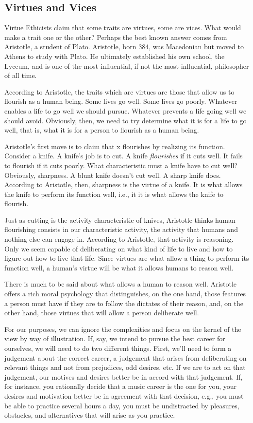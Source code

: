 \documentclass[9pt]{article}
\begin{document}
\subsection{Virtues and Vices}\label{virtues-and-vices}

Virtue Ethicists claim that some traits are virtues, some are vices.
What would make a trait one or the other? Perhaps the best known answer
comes from Aristotle, a student of Plato. Aristotle, born 384, was
Macedonian but moved to Athens to study with Plato. He ultimately
established his own school, the Lyceum, and is one of the most
influential, if not the most influential, philosopher of all time.

According to Aristotle, the traits which are virtues are those that
allow us to flourish as a human being. Some lives go well. Some lives go
poorly. Whatever enables a life to go well we should pursue. Whatever
prevents a life going well we should avoid. Obviously, then, we need to
try determine what it is for a life to go well, that is, what it is for
a person to flourish as a human being.

Aristotle's first move is to claim that x flourishes by realizing its
function. Consider a knife. A knife's job is to cut. A knife
\emph{flourishes} if it cuts well. It fails to flourish if it cuts
poorly. What characteristic must a knife have to cut well? Obviously,
sharpness. A blunt knife doesn't cut well. A sharp knife does. According
to Aristotle, then, sharpness is the virtue of a knife. It is what
allows the knife to perform its function well, i.e., it it is what
allows the knife to flourish.

Just as cutting is the activity characteristic of knives, Aristotle
thinks human flourishing consists in our characteristic activity, the
activity that humans and nothing else can engage in. According to
Aristotle, that activity is reasoning. Only we seem capable of
deliberating on what kind of life to live and how to figure out how to
live that life. Since virtues are what allow a thing to perform its
function well, a human's virtue will be what it allows humans to reason
well.

There is much to be said about what allows a human to reason well.
Aristotle offers a rich moral psychology that distinguishes, on the one
hand, those features a person must have if they are to follow the
dictates of their reason, and, on the other hand, those virtues that
will allow a person deliberate well.

For our purposes, we can ignore the complexities and focus on the kernel
of the view by way of illustration. If, say, we intend to pursue the
best career for ourselves, we will need to do two different things.
First, we'll need to form a judgement about the correct career, a
judgement that arises from deliberating on relevant things and not from
prejudices, odd desires, etc. If we are to act on that judgement, our
motives and desires better be in accord with that judgement. If, for
instance, you rationally decide that a music career is the one for you,
your desires and motivation better be in agreement with that decision,
e.g., you must be able to practice several hours a day, you must be
undistracted by pleasures, obstacles, and alternatives that will arise
as you practice.
\end{document}
